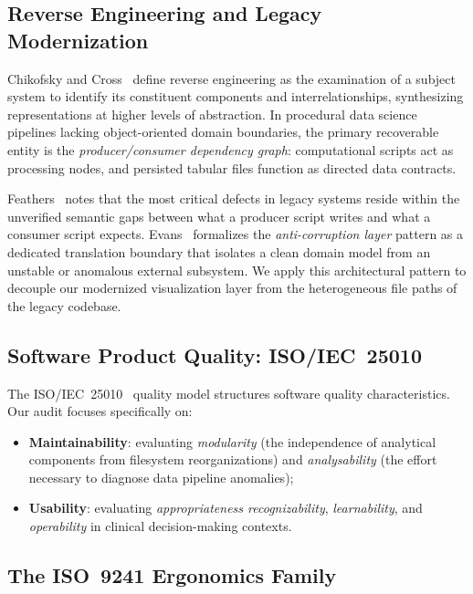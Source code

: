 \documentclass[conference]{IEEEtran}
\begin{document}
\subsection{Reverse Engineering and Legacy Modernization}

Chikofsky and Cross~\cite{Chikofsky1990} define reverse engineering as the examination of a subject system to identify its constituent components and interrelationships, synthesizing representations at higher levels of abstraction. In procedural data science pipelines lacking object-oriented domain boundaries, the primary recoverable entity is the \textit{producer/consumer dependency graph}: computational scripts act as processing nodes, and persisted tabular files function as directed data contracts.

Feathers~\cite{Feathers2004} notes that the most critical defects in legacy systems reside within the unverified semantic gaps between what a producer script writes and what a consumer script expects. Evans~\cite{Evans2003} formalizes the \textit{anti-corruption layer} pattern as a dedicated translation boundary that isolates a clean domain model from an unstable or anomalous external subsystem. We apply this architectural pattern to decouple our modernized visualization layer from the heterogeneous file paths of the legacy codebase.

\subsection{Software Product Quality: ISO/IEC~25010}

The ISO/IEC~25010~\cite{ISO25010} quality model structures software quality characteristics. Our audit focuses specifically on:
\begin{itemize}
  \item \textbf{Maintainability}: evaluating \textit{modularity} (the independence of analytical components from filesystem reorganizations) and \textit{analysability} (the effort necessary to diagnose data pipeline anomalies);
  \item \textbf{Usability}: evaluating \textit{appropriateness recognizability}, \textit{learnability}, and \textit{operability} in clinical decision-making contexts.
\end{itemize}

\subsection{The ISO~9241 Ergonomics Family}
\end{document}

